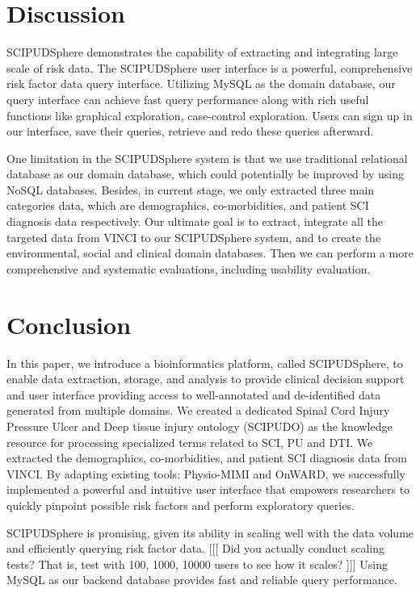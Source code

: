 \documentclass{amia}
\begin{document}
\section{Discussion}
SCIPUDSphere demonstrates the capability of extracting and integrating large scale of risk data. The SCIPUDSphere user interface is a powerful, comprehensive risk factor data query interface. Utilizing MySQL as the domain database, our query interface can achieve fast query performance along with rich useful functions like graphical exploration, case-control exploration. Users can sign up in our interface, save their queries, retrieve and redo these queries afterward. 

One limitation in the SCIPUDSphere system is that we use traditional relational database as our domain database, which could potentially be improved by using NoSQL databases. Besides, in current stage, we only extracted three main categories data, which are demographics, co-morbidities, and patient SCI diagnosis data respectively. Our ultimate goal is to extract, integrate all the targeted data from VINCI to our SCIPUDSphere system, and to create the environmental, social and clinical domain databases. Then we can perform a more comprehensive and systematic evaluations, including usability evaluation. 

\section{Conclusion}
In this paper, we introduce a bioinformatics platform, called SCIPUDSphere, to enable data extraction, storage, and analysis to provide clinical decision support and user interface providing access to well-annotated and de-identified data generated from multiple domains. We created a dedicated Spinal Cord Injury Pressure Ulcer and Deep tissue injury ontology (SCIPUDO) as the knowledge resource for processing specialized terms related to SCI, PU and DTI. We extracted the demographics, co-morbidities, and patient SCI diagnosis data from VINCI. By adapting existing tools: Physio-MIMI and OnWARD, we successfully implemented a powerful and intuitive user interface that empowers researchers to quickly pinpoint possible risk factors and perform exploratory queries.

SCIPUDSphere is promising, given its ability in scaling well with the data volume and efficiently querying risk factor data.  [[[ Did you actually conduct scaling tests?  That is, test with 100, 1000, 10000 users to see how it scales? ]]]  Using MySQL as our backend database provides fast and reliable query performance.
\end{document}
